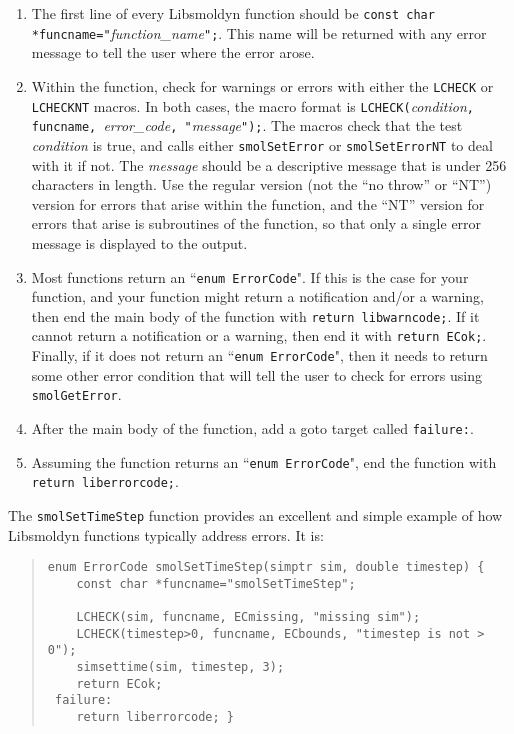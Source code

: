 \documentclass {book}
\newcommand {\ttt} {\texttt}
\begin{document}
\begin{enumerate}
\item The first line of every Libsmoldyn function should be \ttt{const char *funcname="}\emph{function\_name}\ttt{";}. This name will be returned with any error message to tell the user where the error arose.
\item Within the function, check for warnings or errors with either the \ttt{LCHECK} or \ttt{LCHECKNT} macros. In both cases, the macro format is \ttt{LCHECK(}\emph{condition}\ttt{, funcname, }\emph{error\_code}\ttt{, "}\emph{message}\ttt{");}. The macros check that the test \emph{condition} is true, and calls either \ttt{smolSetError} or \ttt{smolSetErrorNT} to deal with it if not. The \emph{message} should be a descriptive message that is under 256 characters in length. Use the regular version (not the ``no throw'' or ``NT'') version for errors that arise within the function, and the ``NT'' version for errors that arise is subroutines of the function, so that only a single error message is displayed to the output.
\item Most functions return an ``\ttt{enum ErrorCode}". If this is the case for your function, and your function might return a notification and/or a warning, then end the main body of the function with \ttt{return libwarncode;}. If it cannot return a notification or a warning, then end it with \ttt{return ECok;}. Finally, if it does not return an ``\ttt{enum ErrorCode}", then it needs to return some other error condition that will tell the user to check for errors using \ttt{smolGetError}.
\item After the main body of the function, add a goto target called \ttt{failure:}.
\item Assuming the function returns an ``\ttt{enum ErrorCode}", end the function with \ttt{return liberrorcode;}.
\end{enumerate}

The \ttt{smolSetTimeStep} function provides an excellent and simple example of how Libsmoldyn functions typically address errors. It is:

\begin{quote}
\begin{lstlisting}
enum ErrorCode smolSetTimeStep(simptr sim, double timestep) {
	const char *funcname="smolSetTimeStep";

	LCHECK(sim, funcname, ECmissing, "missing sim");
	LCHECK(timestep>0, funcname, ECbounds, "timestep is not > 0");
	simsettime(sim, timestep, 3);
	return ECok;
 failure:
	return liberrorcode; }
\end{lstlisting}
\end{quote}
\end{document}
